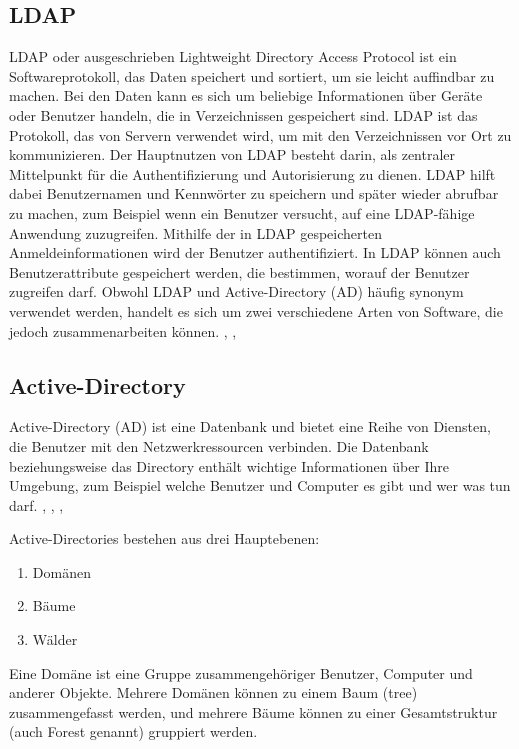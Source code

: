 \subsection{LDAP}
LDAP oder ausgeschrieben Lightweight Directory Access Protocol ist ein Softwareprotokoll, 
das Daten speichert und sortiert, um sie leicht auffindbar zu machen. Bei den Daten kann es 
sich um beliebige Informationen über Geräte oder Benutzer handeln, die in Verzeichnissen 
gespeichert sind. LDAP ist das Protokoll, das von Servern verwendet wird, um mit den 
Verzeichnissen vor Ort zu kommunizieren.
\newline
\newline
Der Hauptnutzen von LDAP besteht darin, als zentraler Mittelpunkt für die Authentifizierung und 
Autorisierung zu dienen. LDAP hilft dabei Benutzernamen und Kennwörter zu speichern und später 
wieder abrufbar zu machen, zum Beispiel wenn ein Benutzer versucht, auf eine LDAP-fähige Anwendung 
zuzugreifen. Mithilfe der in LDAP gespeicherten Anmeldeinformationen 
wird der Benutzer authentifiziert.
\newline
\newline
In LDAP können auch Benutzerattribute gespeichert werden, die bestimmen, worauf der Benutzer 
zugreifen darf. Obwohl LDAP und Active-Directory (AD) häufig synonym verwendet werden, 
handelt es sich um zwei verschiedene Arten von Software, die jedoch zusammenarbeiten können. \cite{bar_was_nodate}, \cite{noauthor_lightweight_nodate}, 

\subsection{Active-Directory}
Active-Directory (AD) ist eine Datenbank und bietet eine Reihe von Diensten, die Benutzer mit den 
Netzwerkressourcen verbinden. Die Datenbank beziehungsweise das Directory enthält wichtige Informationen 
über Ihre Umgebung, zum Beispiel welche Benutzer und Computer es gibt und wer was tun darf. \cite{noauthor_active_nodate}, \cite{noauthor_lightweight_2022}, \cite{noauthor_active_nodate-1}, \cite{noauthor_was_nodate-8}

Active-Directories bestehen aus drei Hauptebenen: 
\begin{enumerate}
  \item Domänen
  \item Bäume
  \item Wälder
\end{enumerate}

Eine Domäne ist eine Gruppe zusammengehöriger Benutzer, Computer und anderer Objekte. 
Mehrere Domänen können zu einem Baum (tree) zusammengefasst werden, und mehrere Bäume können zu 
einer Gesamtstruktur (auch Forest genannt) gruppiert werden.

